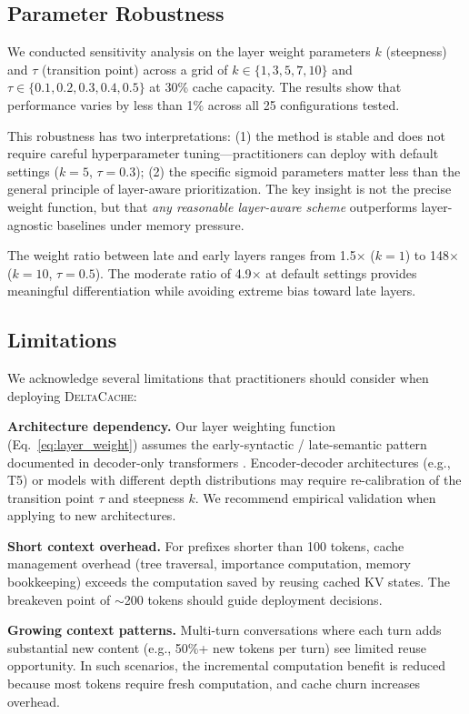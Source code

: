 \documentclass[10pt,conference]{IEEEtran}
\newcommand{\deltacache}{\textsc{DeltaCache}}
\begin{document}
\subsection{Parameter Robustness}

We conducted sensitivity analysis on the layer weight parameters $k$ (steepness) and $\tau$ (transition point) across a grid of $k \in \{1, 3, 5, 7, 10\}$ and $\tau \in \{0.1, 0.2, 0.3, 0.4, 0.5\}$ at 30\% cache capacity. The results show that performance varies by less than 1\% across all 25 configurations tested.

This robustness has two interpretations: (1) the method is stable and does not require careful hyperparameter tuning---practitioners can deploy with default settings ($k=5$, $\tau=0.3$); (2) the specific sigmoid parameters matter less than the general principle of layer-aware prioritization. The key insight is not the precise weight function, but that \emph{any reasonable layer-aware scheme} outperforms layer-agnostic baselines under memory pressure.

The weight ratio between late and early layers ranges from 1.5$\times$ ($k=1$) to 148$\times$ ($k=10$, $\tau=0.5$). The moderate ratio of 4.9$\times$ at default settings provides meaningful differentiation while avoiding extreme bias toward late layers.

\subsection{Limitations}

We acknowledge several limitations that practitioners should consider when deploying \deltacache{}:

\textbf{Architecture dependency.} Our layer weighting function (Eq.~\ref{eq:layer_weight}) assumes the early-syntactic / late-semantic pattern documented in decoder-only transformers \cite{rogers2020primer}. Encoder-decoder architectures (e.g., T5) or models with different depth distributions may require re-calibration of the transition point $\tau$ and steepness $k$. We recommend empirical validation when applying to new architectures.

\textbf{Short context overhead.} For prefixes shorter than 100 tokens, cache management overhead (tree traversal, importance computation, memory bookkeeping) exceeds the computation saved by reusing cached KV states. The breakeven point of $\sim$200 tokens should guide deployment decisions.

\textbf{Growing context patterns.} Multi-turn conversations where each turn adds substantial new content (e.g., 50\%+ new tokens per turn) see limited reuse opportunity. In such scenarios, the incremental computation benefit is reduced because most tokens require fresh computation, and cache churn increases overhead.
\end{document}
